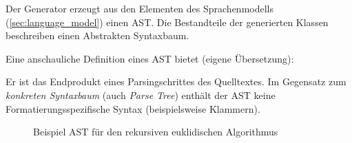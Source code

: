 Der Generator erzeugt aus den Elementen des Sprachenmodells (\cref{sec:language_model}) einen \gls{AST}. 
Die Bestandteile der generierten Klassen beschreiben einen Abstrakten Syntaxbaum.

Eine anschauliche Definition eines \gls{AST} bietet \cite[][S. 69]{ahoCompiler} (eigene Übersetzung):


Er ist das Endprodukt eines Parsingschrittes des Quelltextes. Im Gegensatz zum \emph{konkreten Syntaxbaum} (auch \emph{Parse Tree}) enthält der \gls{AST} keine Formatierungsspezifische Syntax (beispielsweise Klammern). 

\begin{figure}
    \centering
        \centering
    \caption{Beispiel \gls{AST} für den rekursiven euklidischen Algorithmus}
    \label{fig:ast}   
\end{figure}


